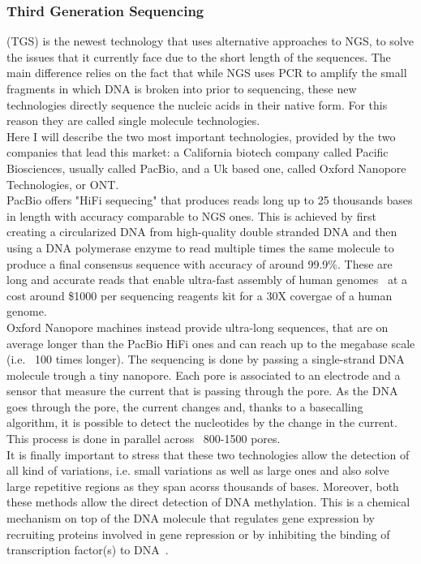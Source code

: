 \subsubsection{Third Generation Sequencing} (TGS) is the newest technology that uses alternative approaches to NGS, to solve the issues that it currently face due to the short length of the sequences. The main difference relies on the fact that while NGS uses PCR to amplify the small fragments in which DNA is broken into prior to sequencing, these new technologies directly sequence the nucleic acids in their native form. For this reason they are called single molecule technologies.\\
Here I will describe the two most important technologies, provided by the two companies that lead this market: a California biotech company called Pacific Biosciences, usually called PacBio, and a Uk based one, called Oxford Nanopore Technologies, or ONT.\\
PacBio offers "HiFi sequecing" that produces reads long up to 25 thousands bases in length with accuracy comparable to NGS ones. This is achieved by first creating a circularized DNA from high-quality double stranded DNA and then using a DNA polymerase enzyme to read multiple times the same molecule to produce a final consensus sequence with accuracy of around 99.9\%. These are long and accurate reads that enable ultra-fast assembly of human genomes~\cite{mdbg} at a cost around \$1000 per sequencing reagents kit for a 30X covergae of a human genome. \\
Oxford Nanopore machines instead provide ultra-long sequences, that are on average longer than the PacBio HiFi ones and can reach up to the megabase scale (i.e. ~100 times longer). The sequencing is done by passing a single-strand DNA molecule trough a tiny nanopore. Each pore is associated to an electrode and a sensor that measure the current that is passing through the pore. As the DNA goes through the pore, the current changes and, thanks to a basecalling algorithm, it is possible to detect the nucleotides by the change in the current. This process is done in parallel across ~800-1500 pores.\\
It is finally important to stress that these two technologies allow the detection of all kind of variations, i.e. small variations as well as large ones and also solve large repetitive regions as they span acorss thousands of bases. Moreover, both these methods allow the direct detection of DNA methylation. This is a chemical mechanism on top of the DNA molecule that regulates gene expression  by recruiting proteins involved in gene repression or by inhibiting the binding of transcription factor(s) to DNA~\cite{methylation}. \\
